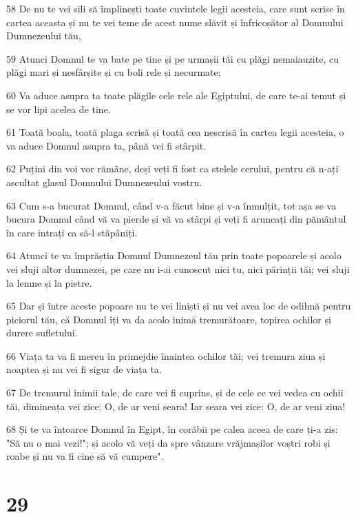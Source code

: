 \par 58 De nu te vei sili să împlinești toate cuvintele legii acesteia, care sunt scrise în cartea aceasta și nu te vei teme de acest nume slăvit și înfricoșător al Domnului Dumnezeului tău,
\par 59 Atunci Domnul te va bate pe tine și pe urmașii tăi cu plăgi nemaiauzite, cu plăgi mari și nesfârșite și cu boli rele și necurmate;
\par 60 Va aduce asupra ta toate plăgile cele rele ale Egiptului, de care te-ai temut și se vor lipi acelea de tine.
\par 61 Toată boala, toată plaga scrisă și toată cea nescrisă în cartea legii acesteia, o va aduce Domnul asupra ta, până vei fi stârpit.
\par 62 Puțini din voi vor rămâne, deși veți fi fost ca stelele cerului, pentru că n-ați ascultat glasul Domnului Dumnezeului vostru.
\par 63 Cum s-a bucurat Domnul, când v-a făcut bine și v-a înmulțit, tot așa se va bucura Domnul când vă va pierde și vă va stârpi și veți fi aruncați din pământul în care intrați ca să-l stăpâniți.
\par 64 Atunci te va împrăștia Domnul Dumnezeul tău prin toate popoarele și acolo vei sluji altor dumnezei, pe care nu i-ai cunoscut nici tu, nici părinții tăi; vei sluji la lemne și la pietre.
\par 65 Dar și între aceste popoare nu te vei liniști și nu vei avea loc de odihnă pentru piciorul tău, că Domnul îți va da acolo inimă tremurătoare, topirea ochilor și durere sufletului.
\par 66 Viața ta va fi mereu în primejdie înaintea ochilor tăi; vei tremura ziua și noaptea și nu vei fi sigur de viața ta.
\par 67 De tremurul inimii tale, de care vei fi cuprins, și de cele ce vei vedea cu ochii tăi, dimineața vei zice: O, de ar veni seara! Iar seara vei zice: O, de ar veni ziua!
\par 68 Și te va întoarce Domnul în Egipt, în corăbii pe calea aceea de care ți-a zis: "Să nu o mai vezi!"; și acolo vă veți da spre vânzare vrăjmașilor voștri robi și roabe și nu va fi cine să vă cumpere".

\chapter{29}

